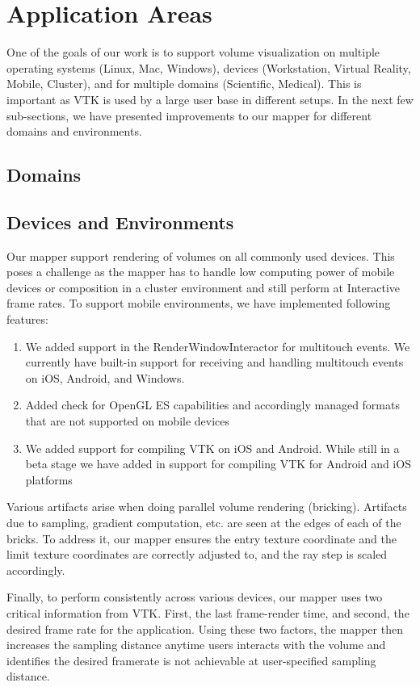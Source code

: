 \section{Application Areas}
\label{applicationareas}

One of the goals of our work is to support volume visualization on multiple
operating systems (Linux, Mac, Windows), devices (Workstation,
Virtual Reality, Mobile, Cluster), and for multiple domains (Scientific, Medical).
This is important as VTK is used by a large user base in different setups.
In the next few sub-sections, we have presented improvements to
our mapper for different domains and environments.

\subsection{Domains}
\label{domains}

\subsection{Devices and Environments}
Our mapper support rendering of volumes on all commonly used devices. This poses
a challenge as the mapper has to handle low computing power of mobile devices or
composition in a cluster environment and still perform at Interactive frame rates.
To support mobile environments, we have implemented following features:
\begin{enumerate}
  \item We added support in the RenderWindowInteractor for multitouch
  events. We currently have built-in support for receiving and handling
  multitouch events on iOS, Android, and Windows.
  \item Added check for OpenGL ES capabilities and accordingly managed
  formats that are not supported on mobile devices
  \item We added support for compiling VTK on iOS and Android. While still
  in a beta stage we have added in support for compiling VTK for Android and
  iOS platforms
\end{enumerate}

Various artifacts arise when doing parallel volume rendering (bricking). Artifacts
due to sampling, gradient computation, etc.  are seen at the edges of each of the bricks.
To address it, our mapper ensures the entry texture coordinate and the limit texture
coordinates are correctly adjusted to, and the ray step is scaled accordingly.

Finally, to perform consistently across various devices, our mapper uses two
critical information from VTK. First, the last frame-render time, and second,
the desired frame rate for the application. Using these two factors,  the mapper
then increases the sampling distance anytime users interacts with
the volume and identifies the desired framerate is not achievable at user-specified
sampling distance.


\label{devices}
